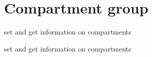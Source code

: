 \hypertarget{group__compartment}{
\section{\-Compartment group}
\label{group__compartment}
}


set and get information on compartments  


set and get information on compartments 